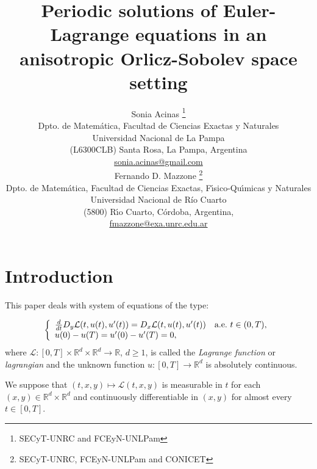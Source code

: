 \documentclass[twoside]{article}
\title{Periodic solutions of
Euler-Lagrange equations in an anisotropic Orlicz-Sobolev space setting  }
\author{Sonia Acinas \thanks{SECyT-UNRC and  FCEyN-UNLPam}\\
Dpto. de Matem\'atica, Facultad de Ciencias Exactas y Naturales\\
Universidad Nacional de La Pampa\\
(L6300CLB) Santa Rosa, La Pampa, Argentina\\
\url{sonia.acinas@gmail.com}\\[3mm]
Fernando D. Mazzone \thanks{SECyT-UNRC, FCEyN-UNLPam and CONICET}\\
Dpto. de Matem\'atica, Facultad de Ciencias Exactas, F\'{\i}sico-Qu\'{\i}micas y Naturales\\
Universidad Nacional de R\'{i}o Cuarto\\
(5800) R\'{\i}o Cuarto, C\'ordoba, Argentina,\\
\url{fmazzone@exa.unrc.edu.ar}
}
\date{}
\theoremstyle{remark}
\newcommand{\rr}{\mathbb{R}}
\renewcommand{\geq}{\geqslant}
\begin{document}
\maketitle
%
\begingroup%
    \renewcommand{\thefootnote}{}%
    \endgroup
%
%
%
%

\begin{abstract}


\end{abstract}






\pagestyle{fancy} \headheight 35pt \fancyhead{} \fancyfoot{}

\fancyfoot[C]{\thepage}  \fancyhead[CO]{\nouppercase{\section}}

\fancyhead[CO]{\nouppercase{\leftmark}}






\section{Introduction}


This paper deals with system  of equations of the type:

\begin{equation}\label{ProbPrin-gral}
    \left\{%
\begin{array}{ll}
  \frac{d}{dt} D_{y}\mathcal{L}(t,u(t),u'(t))= D_{x}\mathcal{L}(t,u(t),u'(t)) \quad \hbox{a.e.}\ t \in (0,T),\\
    u(0)-u(T)=u'(0)-u'(T)=0,
\end{array}%
\right.
\end{equation}
where $\mathcal{L}:[0,T]\times\rr^d\times\rr^d\to\rr$, $d\geq 1$, is called the \emph{Lagrange function} or \emph{lagrangian} and the unknown function  $u:[0,T]\to\rr^d$ is absolutely continuous. 

We suppose that $(t,x,y)\mapsto \mathcal{L}(t,x,y)$ is measurable in $t$ for each $(x,y)\in \rr^d\times\rr^d$ and 
continuously differentiable in $(x,y)$ for almost every $t \in [0,T]$.
\end{document}
